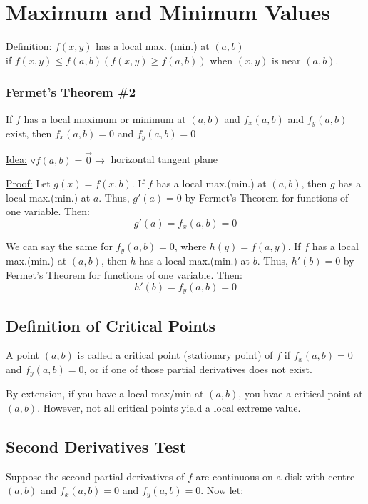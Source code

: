 \documentclass[12pt]{article}
\begin{document}
\section{Maximum and Minimum Values}
\underline{Definition:} \(f(x,y)\)  has a local max. (min.) at \((a,b)\)  \\if \(f(x,y) \leq f(a,b) (f(x,y) \geq f(a,b))\) when \((x,y)\) is near \((a,b)\).


\subsubsection{Fermet's Theorem \#2}
If \(f\) has a local maximum or minimum at \((a,b)\) and \(f_x(a,b)\) and \(f_y(a,b)\) exist, then \(f_x(a,b)=0\) and \(f_y(a,b) = 0\) 

\underline{Idea:} \(\triangledown f(a,b) = \vec{0}  \rightarrow \) horizontal tangent plane

\underline{Proof:} Let \(g(x) = f(x,b)\). If \(f\) has a local max.(min.) at \((a,b)\), then \(g\) has a local max.(min.) at \(a\). Thus, \(g'(a) = 0\)  by Fermet's Theorem for functions of one variable. Then:
\[
	g'(a) = f_x(a,b) = 0
\]

We can say the same for \(f_y(a,b) = 0\), where \(h(y) = f(a,y)\). If \(f\) has a local max.(min.) at \((a,b)\), then \(h\) has a local max.(min.) at \(b\). Thus, \(h'(b) = 0\) by Fermet's Theorem for functions of one variable. Then:
\[
	h'(b) = f_y(a,b) = 0
\]

\subsection{Definition of Critical Points}
A point \((a,b)\) is called a \underline{critical point} (stationary point) of \(f\)  if \(f_x(a,b) = 0\) and \(f_y(a,b) = 0\), or if one of those partial derivatives does not exist. 

By extension, if you have a local max/min at \((a,b)\), you hvae a critical point at \((a,b)\). 
However, not all critical points yield a local extreme value.

\subsection{Second Derivatives Test} 
Suppose the second partial derivatives of \(f\) are continuous on a disk with centre \((a,b)\) and \(f_x(a,b) = 0\) and \(f_y(a,b) = 0\). Now let:
\end{document}

